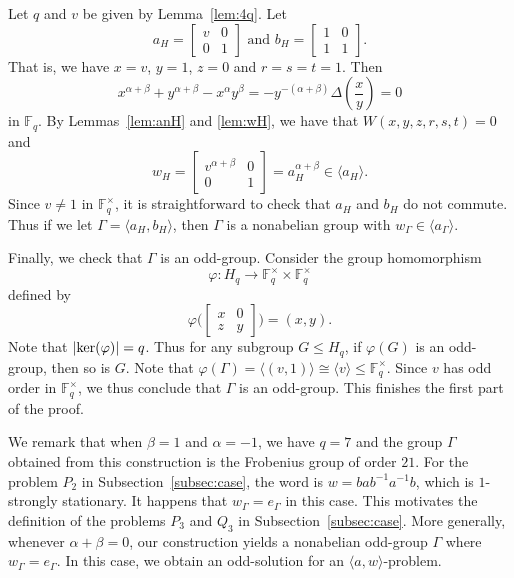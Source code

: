 \documentclass[10pt,a4paper]{amsart}
\theoremstyle{definition}
\theoremstyle{definition}
\numberwithin{equation}{section}
\begin{document}
Let $q$ and $v$ be given by Lemma~\ref{lem:4q}. Let 
\begin{equation} a_H=\left[\begin{array}{cc} v& 0 \\ 0 & 1\end{array}\right] \mbox{ and } b_H=\left[\begin{array}{cc} 1 & 0 \\ 1 & 1\end{array}\right]. \end{equation}
That is, we have $x=v$, $y=1$, $z=0$ and $r=s=t=1$. Then
$$ x^{\alpha+\beta}+y^{\alpha+\beta}-x^\alpha y^\beta=-y^{-(\alpha+\beta)}\Delta\left(\frac{x}{y}\right)=0$$
in $\mathbb{F}_q$. By Lemmas~\ref{lem:anH} and \ref{lem:wH}, we have that $W(x,y,z,r,s,t)=0$ and
$$ w_H=\left[\begin{array}{cc} v^{\alpha+\beta} & 0 \\ 0 & 1\end{array}\right]=a_H^{\alpha+\beta}\in \langle a_H\rangle. $$
Since $v\neq 1$ in $\mathbb{F}_q^\times$, it is straightforward to check that $a_H$ and $b_H$ do not commute. Thus if we let $\Gamma=\langle a_H, b_H\rangle$, then $\Gamma$ is a nonabelian group with $w_\Gamma\in \langle a_\Gamma\rangle$. 

Finally, we check that $\Gamma$ is an odd-group. Consider the group homomorphism
$$ \varphi\colon H_q\to \mathbb{F}_q^\times\times \mathbb{F}_q^\times $$
defined by
$$ \varphi\Big( \left[\begin{array}{cc} x & 0 \\ z & y\end{array}\right]\Big)=(x, y). $$
Note that $|\mbox{\rm ker}(\varphi)|=q$. Thus for any subgroup $G\leq H_q$, if $\varphi(G)$ is an odd-group, then so is $G$.  Note that $\varphi(\Gamma)=\langle (v, 1)\rangle\cong \langle v\rangle \leq \mathbb{F}_q^\times$. Since $v$ has odd order in $\mathbb{F}_q^\times$, we thus conclude that $\Gamma$ is an odd-group. This finishes the first part of the proof. 

We remark that when $\beta=1$ and $\alpha=-1$, we have $q=7$ and the group $\Gamma$ obtained from this construction is the Frobenius group of order $21$. For the problem $P_2$ in Subsection~\ref{subsec:case}, the word is $w=bab^{-1}a^{-1}b$, which is $1$-strongly stationary. It happens that $w_\Gamma=e_\Gamma$ in this case. This motivates the definition of the problems $P_3$ and $Q_3$ in Subsection~\ref{subsec:case}. More generally, whenever $\alpha+\beta=0$, our construction yields a nonabelian odd-group $\Gamma$ where $w_\Gamma=e_\Gamma$. In this case, we obtain an odd-solution for an $\langle a, w\rangle$-problem.
\end{document}
